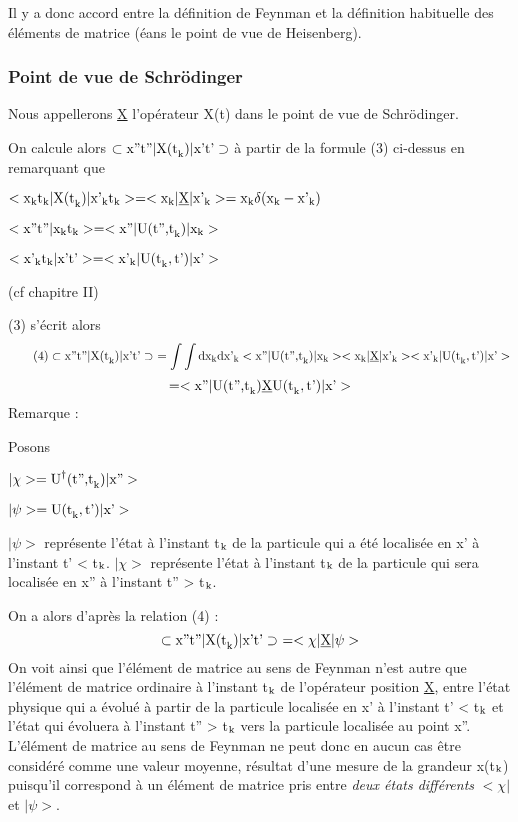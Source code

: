 Il y a donc accord entre la définition de Feynman et la définition habituelle
des éléments de matrice (éans le point de vue de Heisenberg).
\subsubsection{Point de vue de Schrödinger}%

Nous appellerons \underline{X} l'opérateur X(t) dans le point de vue de
Schrödinger.

On calcule alors $\subset \text{x''t''} | \text{X(t}_{\text{k}}) | \text{x't'}\supset$ à partir de la
formule (3) ci-dessus en remarquant que
\begin{center}
$< \text{x}_{\text{k}}\text{t}_{\text{k}} | \text{X(t}_{\text{k}})| \text{x'}_{\text{k}}\text{t}_{\text{k}} >
= < \text{x}_{\text{k}} | \underline{\text{X}} | \text{x'}_{\text{k}} >
=\text{x}_{\text{k}}\delta(\text{x}_{\text{k}}-\text{x'}_{\text{k}})$

$< \text{x''t''} | \text{x}_{\text{k}}\text{t}_{\text{k}} > =
< \text{x''} | \text{U(t'',t}_{\text{k}})| \text{x}_{\text{k}} >$

$< \text{x'}_{\text{k}}\text{t}_{\text{k}} | \text{x't'} > =
< \text{x'}_{\text{k}} | \text{U(t}_{\text{k}},\text{t')}| \text{x'} >$

(cf chapitre II)
\end{center}

(3) s'écrit alors
\[
\tag{4}\subset \text{x''t''} | \text{X(t}_{\text{k}}) | \text{x't'}\supset\ =
\int\int \text{dx}_{\text{k}} \text{dx'}_{\text{k}}
 < \text{x''} | \text{U(t'',t}_{\text{k}})| \text{x}_{\text{k}} >
 < \text{x}_{\text{k}} | \underline{\text{X}} | \text{x'}_{\text{k}} >
 < \text{x'}_{\text{k}} | \text{U(t}_{\text{k}},\text{t')}| \text{x'} >
\]\[
=< \text{x''} | \text{U(t'',t}_{\text{k}}) \underline{\text{X}} \text{U(t}_{\text{k}},\text{t')}| \text{x'} >
\]
Remarque :

\begin{minipage}[c]{.15\linewidth}
Posons
\end{minipage}
\begin{minipage}[c]{.35\linewidth}
$|\chi>=\text{U}^\dagger\text{(t'',t}_{\text{k}})| \text{x''} >$

$|\psi> = \text{U(t}_{\text{k}},\text{t')}| \text{x'} >$
\end{minipage}
\hfill

$|\psi>$ représente l'état à l'instant t$_{\text{k}}$ de la particule qui a été localisée
en x' à l'instant t' < t$_{\text{k}}$.
$|\chi>$ représente l'état à l'instant t$_{\text{k}}$ de la particule qui sera localisée en
x'' à l'instant t'' > t$_{\text{k}}$.

On a alors d'après la relation (4) :
\[
\subset \text{x''t''} | \text{X(t}_{\text{k}}) | \text{x't'}\supset\ =
<\chi| \underline{\text{X}} |\psi>
\]
On voit ainsi que l'élément de matrice au sens de Feynman n'est
autre que l'élément de matrice ordinaire à l'instant t$_{\text{k}}$ de l'opérateur position \underline{X}, entre l'état physique qui a évolué à partir de la particule localisée
en x' à l'instant t' < t$_{\text{k}}$ et l'état qui évoluera à l'instant t'' > t$_{\text{k}}$ vers
la particule localisée au point x''. L'élément de matrice au sens de Feynman
ne peut donc en aucun cas être considéré comme une valeur moyenne, résultat
d'une mesure de la grandeur x(t$_{\text{k}}$) puisqu'il correspond à un élément de
matrice pris entre {\it deux états différents} $<\chi|$ et $|\psi>$.

